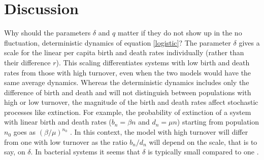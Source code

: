 \section{Discussion}

Why should the parameters $\delta$ and $q$ matter if they do not show up in the no fluctuation, deterministic dynamics of equation \ref{logistic}? 
The parameter $\delta$ gives a scale for the linear per capita birth and death rates individually (rather than their difference $r$).
This scaling differentiates systems with low birth and death rates from those with high turnover, even when the two models would have the same average dynamics. 
Whereas the deterministic dynamics includes only the difference of birth and death and will not distinguish between populations with high or low turnover, the magnitude of the birth and death rates affect stochastic processes like extinction. 
For example, the probability of extinction of a system with linear birth and death rates ($b_n=\beta n$ and $d_n=\mu n$) starting from population $n_0$ goes as $(\beta/\mu)^{n_0}$ \cite{Nisbet1982}.
In this context, the model with high turnover will differ from one with low turnover as the ratio $b_n/d_n$ will depend on the scale, that is to say, on $\delta$. 
In bacterial systems it seems that $\delta$ is typically small compared to one \cite{Servais1985}. 

